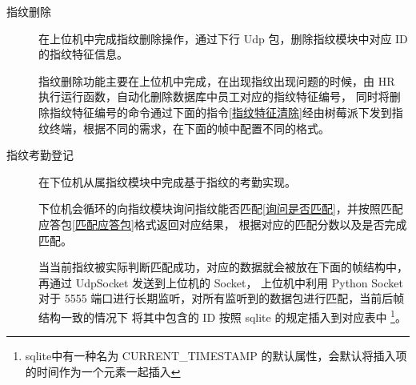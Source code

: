 \begin{description}
        \begin{table}[htbp]
             \caption{获取指纹特征命令用户层帧} \label{uart::upload-data}
        \end{table}

        \item[指纹删除] 在上位机中完成指纹删除操作，通过下行 Udp 包，删除指纹模块中对应 ID 的指纹特征信息。
        
        指纹删除功能主要在上位机中完成，在出现指纹出现问题的时候，由 HR 执行运行函数，自动化删除数据库中员工对应的指纹特征编号，
        同时将删除指纹特征编号的命令通过下面的指令\ref{指纹特征清除}经由树莓派下发到指纹终端，根据不同的需求，在下面的帧中配置不同的格式。

        \begin{table}[ht]
             \caption{指纹特征清除} \label{指纹特征清除}
        \end{table}

        \item[指纹考勤登记] 在下位机从属指纹模块中完成基于指纹的考勤实现。
        
        下位机会循环的向指纹模块询问指纹能否匹配\ref{询问是否匹配}，并按照匹配应答包\ref{匹配应答包}格式返回对应结果，
        根据对应的匹配分数以及是否完成匹配。

        当当前指纹被实际判断匹配成功，对应的数据就会被放在下面的帧结构中，再通过 UdpSocket 发送到上位机的 Socket，
        上位机中利用 Python Socket 对于 5555 端口进行长期监听，对所有监听到的数据包进行匹配，当前后帧结构一致的情况下
        将其中包含的 ID 按照 sqlite 的规定插入到对应表中
        \footnote{sqlite中有一种名为 CURRENT\_TIMESTAMP 的默认属性，会默认将插入项的时间作为一个元素一起插入}。


\end{description}
